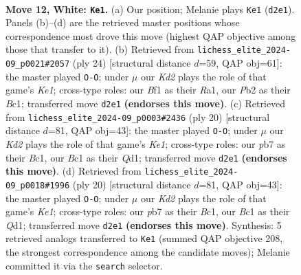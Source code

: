 \documentclass[11pt]{article}
\begin{document}
\clearpage

\begin{figure}[p]\centering
\begin{subfigure}{0.46\textwidth}\centering
\resizebox{\linewidth}{!}{%
\newchessgame
\chessboard[
  setfen={rnbq1kr1/pp2bppp/5n2/3p2N1/3P4/2N5/PP1K1PPP/R1BQ1B1R w - - 6 12},
  showmover=false,
  pgfstyle=straightmove, color=movearrow, markmove={d2-e1}
]}
\caption{}
\end{subfigure}\hfill
\begin{subfigure}{0.46\textwidth}\centering
\resizebox{\linewidth}{!}{%
\newchessgame
\chessboard[
  setfen={r1bq1rk1/ppp3pp/5n2/3pb3/8/2PBN3/PP3PPP/R1BQK2R w KQ - 0 13},
  showmover=false,
  pgfstyle=straightmove, color=movearrow, markmove={e1-g1}
]}
\caption{}
\end{subfigure}
\\[4pt]
\begin{subfigure}{0.46\textwidth}\centering
\resizebox{\linewidth}{!}{%
\newchessgame
\chessboard[
  setfen={r1bqk2r/p3nppp/2p5/2bpP3/8/2NB4/PP3PPP/R1BQK2R w KQkq - 2 11},
  showmover=false,
  pgfstyle=straightmove, color=movearrow, markmove={e1-g1}
]}
\caption{}
\end{subfigure}\hfill
\begin{subfigure}{0.46\textwidth}\centering
\resizebox{\linewidth}{!}{%
\newchessgame
\chessboard[
  setfen={r1bqk2r/p3nppp/2p5/2bpP3/8/2NB4/PP3PPP/R1BQK2R w KQkq - 2 11},
  showmover=false,
  pgfstyle=straightmove, color=movearrow, markmove={e1-g1}
]}
\caption{}
\end{subfigure}
\caption{\textbf{Move 12, White: \texttt{Ke1}.} (a) Our position; Melanie plays \texttt{Ke1} (\texttt{d2e1}). Panels (b)--(d) are the retrieved master positions whose correspondence most drove this move (highest QAP objective among those that transfer to it). (b) Retrieved from \texttt{lichess\_elite\_2024-09\_p0021\#2057} (ply 24) [structural distance $d$=59, QAP obj=61]: the master played \texttt{O-O}; under $\mu$ our \emph{Kd2} plays the role of that game's \emph{Ke1}; cross-type roles: our \emph{B}f1 as their \emph{R}a1, our \emph{P}b2 as their \emph{B}c1; transferred move \texttt{d2e1} \textbf{(endorses this move)}. (c) Retrieved from \texttt{lichess\_elite\_2024-09\_p0003\#2436} (ply 20) [structural distance $d$=81, QAP obj=43]: the master played \texttt{O-O}; under $\mu$ our \emph{Kd2} plays the role of that game's \emph{Ke1}; cross-type roles: our \emph{p}b7 as their \emph{B}c1, our \emph{B}c1 as their \emph{Q}d1; transferred move \texttt{d2e1} \textbf{(endorses this move)}. (d) Retrieved from \texttt{lichess\_elite\_2024-09\_p0018\#1996} (ply 20) [structural distance $d$=81, QAP obj=43]: the master played \texttt{O-O}; under $\mu$ our \emph{Kd2} plays the role of that game's \emph{Ke1}; cross-type roles: our \emph{p}b7 as their \emph{B}c1, our \emph{B}c1 as their \emph{Q}d1; transferred move \texttt{d2e1} \textbf{(endorses this move)}. Synthesis: 5 retrieved analogs transferred to \texttt{Ke1} (summed QAP objective 208, the strongest correspondence among the candidate moves); Melanie committed it via the \texttt{search} selector.}
\label{fig:thought-m22}
\end{figure}
\end{document}

